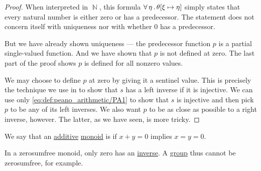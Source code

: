 \begin{proof}
  When interpreted in \( \BbbN \), this formula \( \forall \thinspace \eta \thinspace . \thinspace \theta[\xi \mapsto \eta] \) simply states that every natural number is either zero or has a predecessor. The statement does not concern itself with uniqueness nor with whether \( 0 \) has a predecessor.

  But we have already shown uniqueness --- the predecessor function \( p \) is a partial single-valued function. And we have shown that \( p \) is not defined at zero. The last part of the proof shows \( p \) is defined for all nonzero values.

  We may choose to define \( p \) at zero by giving it a sentinel value. This is precisely the technique we use in  to show that \( s \) has a left inverse if it is injective. We can use only \eqref{eq:def:peano_arithmetic/PA1} to show that \( s \) is injective and then pick \( p \) to be any of its left inverses. We also want \( p \) to be as close as possible to a right inverse, however. The latter, as we have seen, is more tricky.
\end{proof}

\begin{definition}\label{def:zerosumfree}
  We say that an \hyperref[rem:additive_magma]{additive} \hyperref[def:monoid]{monoid} is  if \( x + y = 0 \) implies \( x = y = 0 \).

  In a zerosumfree monoid, only zero has an \hyperref[def:monoid_inverse]{inverse}. A \hyperref[def:group]{group} thus cannot be zerosumfree, for example.
\end{definition}

